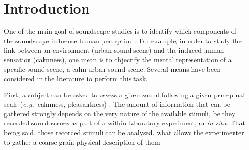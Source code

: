 \documentclass[preprint,12pt]{elsarticle}
\newcommand{\eg}{\emph{e.\,g.}}
\begin{document}
\setlength{\parindent}{5ex}

\section{Introduction}
\label{sec:intro}


One of the main goal of soundscape studies is to identify which components of the soundscape influence human perception \cite{aletta2016soundscape}. For example, in order to study the link between an environment (urban sound scene) and the induced human sensation (calmness), one mean is to objectify the mental representation of a specific sound scene, a calm urban sound scene. Several means have been considered in the literature to perform this task.


First, a subject can be asked to assess a given sound following a given perceptual scale (\eg~calmness, pleasantness) \cite{axelsson2005soundscape,davies2013perception,cain2013development}. The amount of information that can be gathered strongly depends on the very nature of the available stimuli, be they recorded sound scenes as part of a within laboratory experiment, or \emph{in situ}. That being said, those recorded stimuli  can be analysed, what allows the experimenter to gather a coarse
grain physical description of them.

\end{document}
